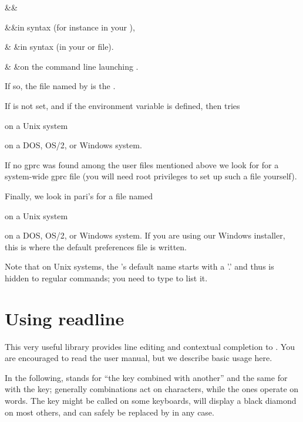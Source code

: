 \settabs\+\indent&\quad&\cr

\+&\quad&in  syntax
(for instance in your ),\cr

\+& &in  syntax
(in your  or  file).\cr

\+& &on the command line launching .\cr

\noindent If so, the file named by  is the .

\noindent\item If  is not set, and if the environment variable
 is defined,  then tries

 on a Unix system

 on a DOS, OS/2, or Windows system.

\noindent\item If no gprc was found among the user files mentioned above
we look for  for a system-wide gprc file (you will need root
privileges to set up such a file yourself).

\noindent\item Finally, we look in pari's  for a file named

 on a Unix system

 on a DOS, OS/2, or Windows system. If you are using our
Windows installer, this is where the default preferences file is written.

\noindent Note that on Unix systems, the 's default name starts
with a '.' and thus is hidden to regular  commands; you need to type
 to list it.


\section{Using readline} 

This very useful library provides line editing and contextual completion
to . You are encouraged to read the  user manual,
but we describe basic usage here.

\label{se:readline}
In the following,  stands for ``the  key combined with
another'' and the same for  with the  key; generally
 combinations act on characters, while the  ones operate on
words. The  key might be called  on some keyboards, will
display a black diamond on most others, and can safely be replaced by
 in any case.

